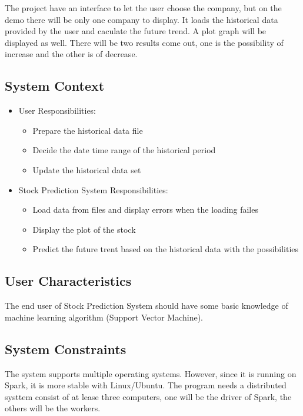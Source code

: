 \documentclass[12pt]{article}
\newcommand{\progname}{Stock Prediction System} %
\begin{document}
The project have an interface to let the user choose the company, but on the demo there will be only one company to display. It loads the historical data provided by the user and caculate the future trend. A plot graph will be displayed  as well. There will be two results come out, one is the possibility of increase and the other is of decrease.

\subsection{System Context}

\begin{itemize}
\item User Responsibilities:
\begin{itemize}
\item Prepare the historical data file
\item Decide the date time range of the historical period
\item Update the historical data set
\end{itemize}
\item \progname{} Responsibilities:
\begin{itemize}
\item Load data  from files and display errors when the loading failes
\item Display the plot of the stock
\item Predict the future trent based on the historical data with the possibilities
\end{itemize}
\end{itemize}

\subsection{User Characteristics} \label{SecUserCharacteristics}

The end user of \progname{} should have some basic knowledge of machine learning algorithm (Support Vector Machine).

\subsection{System Constraints}
The system supports multiple operating systems. However, since it is running on Spark, it is more stable with Linux/Ubuntu. The program needs a distributed systtem consist of at lease three computers, one will be the driver of Spark, the others will be the workers.
\end{document}

